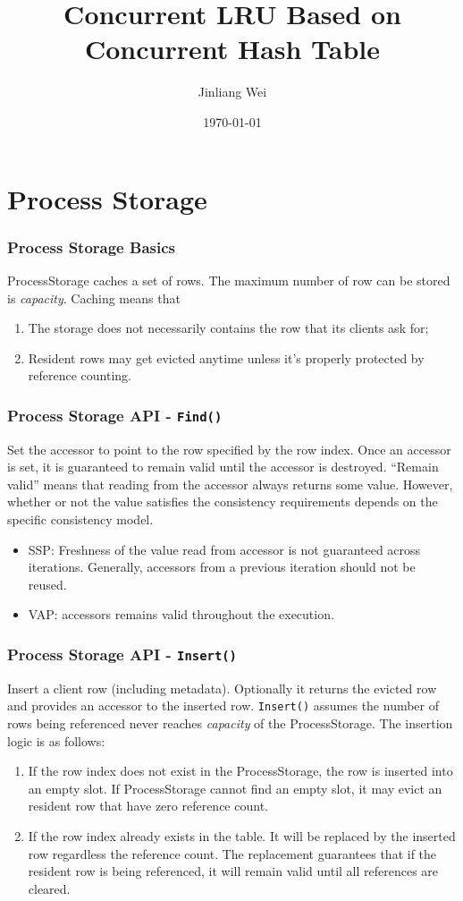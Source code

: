 \documentclass{beamer}
\begin{document}
\title{Concurrent LRU Based on Concurrent Hash Table} 
\author{Jinliang Wei} 
\date{\today} 

\frame{\titlepage} 


\section{Process Storage}

\begin{frame}
\frametitle{Process Storage Basics}
ProcessStorage caches a set of rows. The maximum number of row can be stored is
\emph{capacity}. Caching means that 
\begin{enumerate}
\item The storage does not necessarily contains the row that its clients ask for;
\item Resident rows may get evicted anytime unless it's properly protected by 
reference counting. 
\end{enumerate}

\end{frame}

\begin{frame}
\frametitle{Process Storage API - \texttt{Find()}}
Set the accessor to point to the row specified by 
  the row index. Once an accessor is set, it is guaranteed to remain valid until
 the accessor is destroyed. ``Remain valid'' means that reading
from the accessor always returns some value. However, whether or not the value 
satisfies the consistency requirements depends on the specific consistency model.
\begin{itemize}
\item SSP: Freshness of the value read from accessor is not guaranteed across iterations.
  Generally, accessors from a previous iteration should not be reused.
\item VAP: accessors remains valid throughout the execution.
\end{itemize}
\end{frame}

\begin{frame}
\frametitle{Process Storage API - \texttt{Insert()}}
Insert a client row (including metadata). Optionally it returns the evicted row and
provides an accessor to the inserted row. \texttt{Insert()} assumes the number of rows
being referenced never reaches \emph{capacity} of the ProcessStorage.
The insertion logic is as follows:
\begin{enumerate}
\item If the row index does not exist in the ProcessStorage, the row is inserted
 into an empty slot. If ProcessStorage cannot find an empty slot, it may evict an
 resident row that have zero reference count.
\item If the row index already exists in the table. It will be replaced by the 
  inserted row regardless the reference count. The replacement guarantees that 
  if the resident row is being referenced, it will remain valid until all references
  are cleared.
\end{enumerate}

\end{frame}
\end{document}
